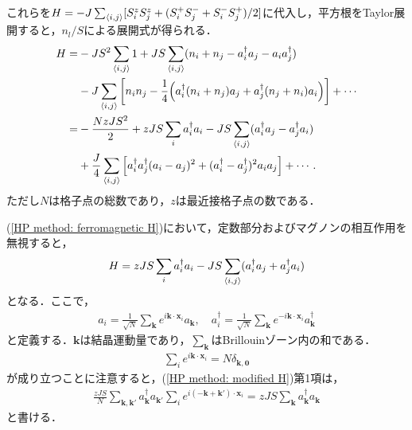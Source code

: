\documentclass[\main/main.tex]{subfiles}
\begin{document}
\begin{frame}
    これらを$H = -J \sum_{\expval{i,j}} [S_i^z S_j^z + (S_i^+ S_j^- + S_i^- S_j^+)/2]$に代入し，平方根をTaylor展開すると，$n_l/S$による展開式が得られる．
    \begin{align}
        H = & -JS^2 \sum_{\expval{i,j}} 1
        + JS \sum_{\expval{i,j}} (n_i + n_j - a_i^\dagger a_j - a_i a_j^\dagger) \nonumber
        \\ &
        -J \sum_{\expval{i,j}} \qty[n_i n_j - \frac{1}{4}\qty(a_i^\dagger (n_i + n_j)a_j + a_j^\dagger(n_j + n_i)a_i)] + \cdots
        \\ 
        = & -\frac{NzJS^2}{2}
        +  zJS \sum_i a_i^\dagger a_i - JS \sum_{\expval{i,j}}(a_i^\dagger a_j - a_j^\dagger a_i)
        \nonumber
        \\ &
        +\frac{J}{4} \sum_{\expval{i,j}} \qty[a_i^\dagger a_j^\dagger(a_i - a_j)^2+(a_i^\dagger - a_j^\dagger)^2 a_i a_j] + \cdots.
        \label{HP method: ferromagnetic H}
    \end{align}
    ただし$N$は格子点の総数であり，$z$は最近接格子点の数である．
\end{frame}

\begin{frame}{}
    (\ref{HP method: ferromagnetic H})において，定数部分およびマグノンの相互作用を無視すると，
    \begin{align}
        H =  zJS \sum_i a_i^\dagger a_i - JS \sum_{\expval{i,j}}(a_i^\dagger a_j + a_j^\dagger a_i) 
        \label{HP method: modified H}
    \end{align}
    となる．ここで，
    \begin{align}
        a_i = \frac{1}{\sqrt{N}}\sum_{\bm{k}} e^{i \bm{k} \cdot \bm{x}_i}a_{\bm{k}},
        \quad
        a_i^\dagger = \frac{1}{\sqrt{N}} \sum_{\bm{k}} e^{-i \bm{k}\cdot \bm{x}_i}a_{\bm{k}}^\dagger
    \end{align}
    と定義する．$\bm{k}$は結晶運動量であり，$\sum_{\bm{k}}$はBrillouinゾーン内の和である．
    \begin{align}
        \sum_{i} e^{i \bm{k}\cdot \bm{x}_i} = N \delta_{\bm{k}, \bm{0}}
    \end{align}
    が成り立つことに注意すると，(\ref{HP method: modified H})第1項は，
    \begin{align}
        \frac{zJS}{N} \sum_{\bm{k},\bm{k}'} a_{\bm{k}}^\dagger a_{\bm{k}'} \sum_i e^{i (-\bm{k}+\bm{k}')\cdot \bm{x}_i}
        = zJS \sum_{\bm{k}} a_{\bm{k}}^\dagger a_{\bm{k}}
    \end{align}
    と書ける．
\end{frame}
\end{document}

